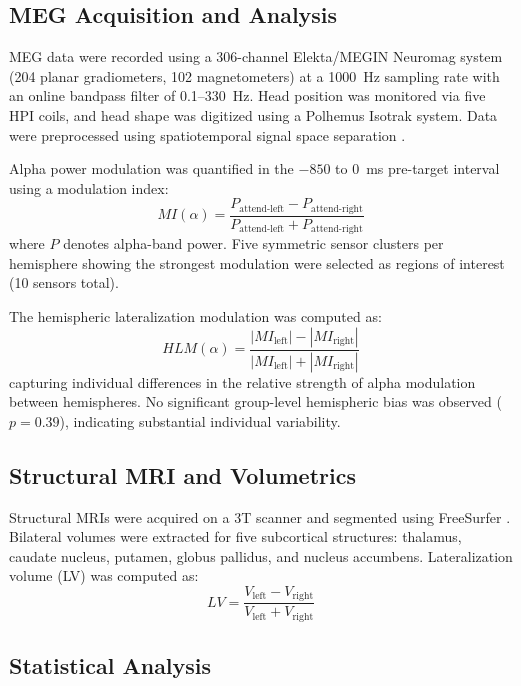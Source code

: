 \documentclass[12pt]{article}
\begin{document}
\subsection{MEG Acquisition and Analysis}

MEG data were recorded using a 306-channel Elekta/MEGIN Neuromag system (204 planar gradiometers, 102 magnetometers) at a 1000~Hz sampling rate with an online bandpass filter of 0.1--330~Hz. Head position was monitored via five HPI coils, and head shape was digitized using a Polhemus Isotrak system. Data were preprocessed using spatiotemporal signal space separation \citep{taulu2006spatiotemporal}.

Alpha power modulation was quantified in the $-850$ to 0~ms pre-target interval using a modulation index:
\begin{equation}
MI(\alpha) = \frac{P_{\text{attend-left}} - P_{\text{attend-right}}}{P_{\text{attend-left}} + P_{\text{attend-right}}}
\label{eq:mi}
\end{equation}
where $P$ denotes alpha-band power. Five symmetric sensor clusters per hemisphere showing the strongest modulation were selected as regions of interest (10 sensors total).

The hemispheric lateralization modulation was computed as:
\begin{equation}
HLM(\alpha) = \frac{|MI_{\text{left}}| - |MI_{\text{right}}|}{|MI_{\text{left}}| + |MI_{\text{right}}|}
\label{eq:hlm}
\end{equation}
capturing individual differences in the relative strength of alpha modulation between hemispheres. No significant group-level hemispheric bias was observed ($p = 0.39$), indicating substantial individual variability.

\subsection{Structural MRI and Volumetrics}

Structural MRIs were acquired on a 3T scanner and segmented using FreeSurfer \citep{fischl2002whole}. Bilateral volumes were extracted for five subcortical structures: thalamus, caudate nucleus, putamen, globus pallidus, and nucleus accumbens. Lateralization volume (LV) was computed as:
\begin{equation}
LV = \frac{V_{\text{left}} - V_{\text{right}}}{V_{\text{left}} + V_{\text{right}}}
\label{eq:lv}
\end{equation}

\subsection{Statistical Analysis}
\end{document}
